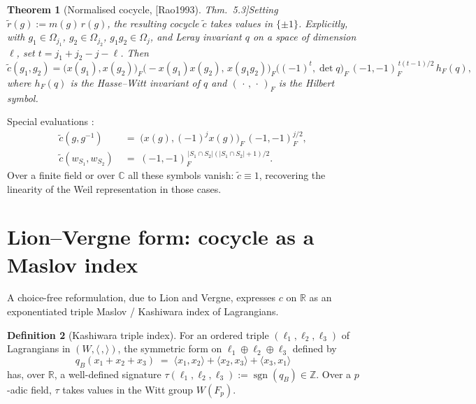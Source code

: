 \documentclass[11pt,letterpaper]{article}
\newcommand{\sgn}{\operatorname{sgn}}
\newcommand{\Maslov}{\tau}
\newcommand{\F}{F}
\newcommand{\R}{\mathbb{R}}
\newcommand{\C}{\mathbb{C}}
\newcommand{\Z}{\mathbb{Z}}
\newcommand{\inv}{^{-1}}
\theoremstyle{plain}
\newtheorem{theorem}{Theorem}[section]
\theoremstyle{definition}
\newtheorem{definition}[theorem]{Definition}
\begin{document}
\begin{theorem}[Normalised cocycle, [Rao1993] Thm.~5.3]\label{thm:rao-norm}
Setting $\widetilde r(g) := m(g)\,r(g)$, the resulting cocycle $\widetilde c$ takes values in $\{\pm 1\}$. Explicitly, with $g_1 \in \Omega_{j_1}$, $g_2 \in \Omega_{j_2}$, $g_1 g_2 \in \Omega_{j}$, and Leray invariant $q$ on a space of dimension $\ell$, set $t = j_1 + j_2 - j - \ell$. Then
\begin{equation}\label{eq:rao-norm-cocycle}
\widetilde c(g_1,g_2)
=
\bigl(x(g_1),x(g_2)\bigr)_\F
\bigl(-x(g_1)x(g_2),\,x(g_1 g_2)\bigr)_\F
\bigl((-1)^t,\det q\bigr)_\F\,
(-1,-1)_\F^{\,t(t-1)/2}\,
h_\F(q),
\end{equation}
where $h_\F(q)$ is the Hasse--Witt invariant of $q$ and $(\,\cdot\,,\,\cdot\,)_\F$ is the Hilbert symbol.
\end{theorem}

Special evaluations \cite[Cor.~5.4--5.5]{Rao1993}:
\begin{align}
\widetilde c(g,g\inv) &\;=\; \bigl(x(g),(-1)^{j}x(g)\bigr)_\F\,(-1,-1)_\F^{j/2},\\
\widetilde c(w_{S_1},w_{S_2}) &\;=\; (-1,-1)_\F^{\,|S_1\cap S_2|(|S_1\cap S_2|+1)/2}.
\end{align}
Over a finite field or over $\C$ all these symbols vanish: $\widetilde c \equiv 1$, recovering the linearity of the Weil representation in those cases.

\section{Lion--Vergne form: cocycle as a Maslov index}
\label{sec:lv}

A choice-free reformulation, due to Lion and Vergne, expresses $c$ on $\R$ as an exponentiated triple Maslov / Kashiwara index of Lagrangians.

\begin{definition}[Kashiwara triple index]
For an ordered triple $(\ell_1,\ell_2,\ell_3)$ of Lagrangians in $(W,\langle\,,\rangle)$, the symmetric form on $\ell_1 \oplus \ell_2 \oplus \ell_3$ defined by
\[
q_B(x_1+x_2+x_3) \;=\; \langle x_1,x_2\rangle + \langle x_2,x_3\rangle + \langle x_3,x_1\rangle
\]
has, over $\R$, a well-defined signature $\Maslov(\ell_1,\ell_2,\ell_3) := \sgn(q_B) \in \Z$. Over a $p$-adic field, $\Maslov$ takes values in the Witt group $W(\F_p)$.
\end{definition}
\end{document}
